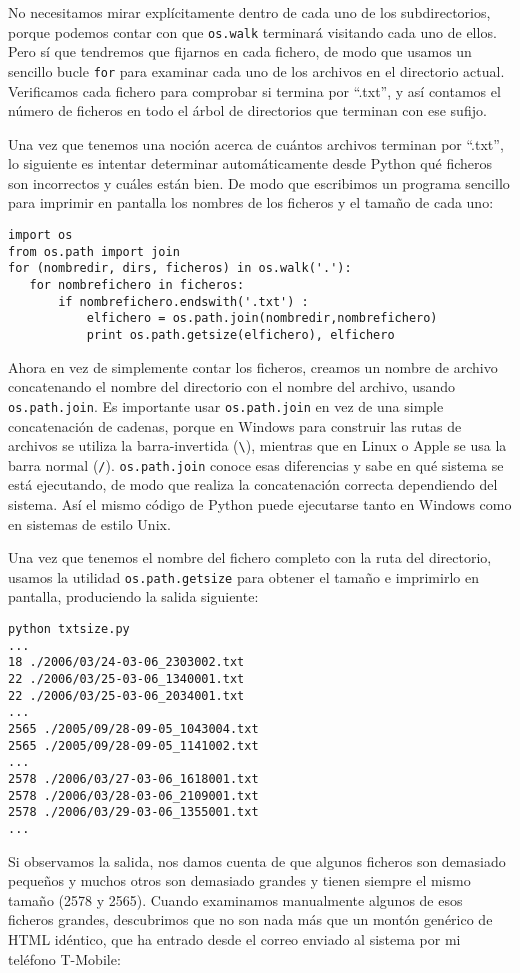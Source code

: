 No necesitamos mirar explícitamente dentro de cada uno de los subdirectorios,
porque podemos contar con que {\tt os.walk} terminará visitando cada
uno de ellos. Pero sí que tendremos que fijarnos en cada fichero, de
modo que usamos un sencillo bucle {\tt for} para examinar cada uno de los archivos
en el directorio actual. Verificamos cada fichero para comprobar si
termina por ``.txt'', y así contamos el número de
ficheros en todo el árbol de directorios que terminan con ese
sufijo.

Una vez que tenemos una noción acerca de cuántos archivos terminan por ``.txt'', lo
siguiente es intentar determinar automáticamente
desde Python qué ficheros son incorrectos y cuáles están bien.
De modo que escribimos un programa sencillo para imprimir en pantalla los
nombres de los ficheros y el tamaño de cada uno:

\beforeverb
\begin{verbatim}
import os
from os.path import join
for (nombredir, dirs, ficheros) in os.walk('.'):
   for nombrefichero in ficheros:
       if nombrefichero.endswith('.txt') :
           elfichero = os.path.join(nombredir,nombrefichero)
           print os.path.getsize(elfichero), elfichero
\end{verbatim}
\afterverb
%
Ahora en vez de simplemente contar los ficheros, creamos
un nombre de archivo concatenando el nombre del directorio con
el nombre del archivo, usando {\tt os.path.join}.
Es importante usar
{\tt os.path.join} en vez de una simple concatenación de cadenas,
porque en Windows para construir las rutas de archivos
se utiliza la barra-invertida (\verb"\"), mientras que en Linux
o Apple se usa la barra normal (\verb"/").
{\tt os.path.join} conoce esas diferencias y sabe en qué
sistema se está ejecutando, de modo que realiza la concatenación correcta
dependiendo del sistema. Así el mismo código de Python
puede ejecutarse tanto en Windows como en sistemas de estilo Unix.

Una vez que tenemos el nombre del fichero completo con la ruta
del directorio, usamos la utilidad {\tt os.path.getsize}
para obtener el tamaño e imprimirlo en pantalla, produciendo la
salida siguiente:

\beforeverb
\begin{verbatim}
python txtsize.py
...
18 ./2006/03/24-03-06_2303002.txt
22 ./2006/03/25-03-06_1340001.txt
22 ./2006/03/25-03-06_2034001.txt
...
2565 ./2005/09/28-09-05_1043004.txt
2565 ./2005/09/28-09-05_1141002.txt
...
2578 ./2006/03/27-03-06_1618001.txt
2578 ./2006/03/28-03-06_2109001.txt
2578 ./2006/03/29-03-06_1355001.txt
...
\end{verbatim}
\afterverb
%
Si observamos la salida, nos damos cuenta de que algunos ficheros son demasiado pequeños y
muchos otros son demasiado grandes y tienen siempre el mismo tamaño (2578 y 2565).
Cuando examinamos manualmente algunos de esos ficheros grandes,
descubrimos que no son nada más que un montón genérico de HTML idéntico, que ha entrado
desde el correo enviado al sistema por mi teléfono T-Mobile:

